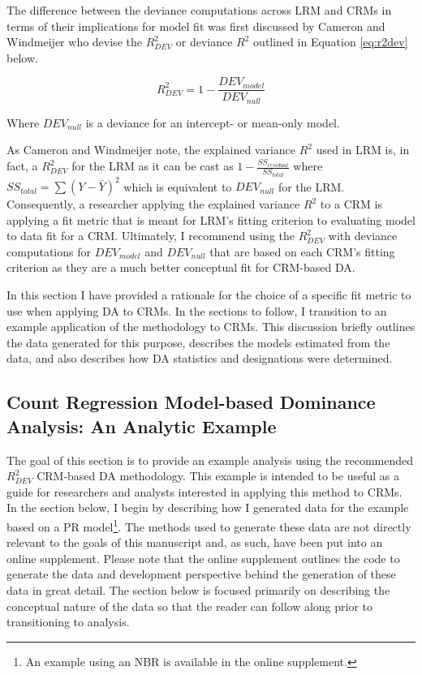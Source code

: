 \documentclass[ShortAfour,times,sageapa]{sagej}
\begin{document}
	The difference between the deviance computations across LRM and CRMs in terms of their implications for model fit was first discussed by Cameron and Windmeijer \citeyear{cameron1996r} who devise the $R^2_{DEV}$ or deviance $R^2$ outlined in Equation \ref{eq:r2dev} below.
	
	\begin{equation}
		R^{2}_{DEV} = 1 - \frac{DEV_{model}}{DEV_{null}}
		\label{eq:r2dev}
	\end{equation}
	
	Where $DEV_{null}$ is a deviance for an intercept- or mean-only model.
	
	As Cameron and Windmeijer note, the explained variance $R^2$ used in LRM is, in fact, a $R^2_{DEV}$ for the LRM as it can be cast as $1 - \frac{SS_{residual}}{SS_{total}}$ where $SS_{total} = \sum (Y - \bar{Y})^2$ which is equivalent to $DEV_{null}$ for the LRM.
	Consequently, a researcher applying the explained variance $R^2$ to a CRM is applying a fit metric that is meant for LRM's fitting criterion to evaluating model to data fit for a CRM.
	Ultimately, I recommend using the $R^{2}_{DEV}$ with deviance computations for $DEV_{model}$ and $DEV_{null}$ that are based on each CRM's fitting criterion as they are a much better conceptual fit for CRM-based DA.
	
	In this section I have provided a rationale for the choice of a specific fit metric to use when applying DA to CRMs.
	In the sections to follow, I transition to an example application of the methodology to CRMs.
	This discussion briefly outlines the data generated for this purpose, describes the models estimated from the data, and also describes how DA statistics and designations were determined.
	
	\subsection{Count Regression Model-based Dominance Analysis: An Analytic Example}
	
	The goal of this section is to provide an example analysis using the recommended $R^2_{DEV}$ CRM-based DA methodology.
	This  example is intended to be useful as a guide for researchers and analysts interested in applying this method to CRMs.
	In the section below, I begin by describing how I generated data for the example based on a PR model\footnote{
		An example using an NBR is available in the online supplement.}.
	The methods used to generate these data are not directly relevant to the goals of this manuscript and, as such, have been put into an online supplement.
	Please note that the online supplement outlines the code to generate the data and development perspective behind the generation of these data in great detail.
	The section below is focused primarily on describing the conceptual nature of the data so that the reader can follow along prior to transitioning to analysis.
	
\end{document}
